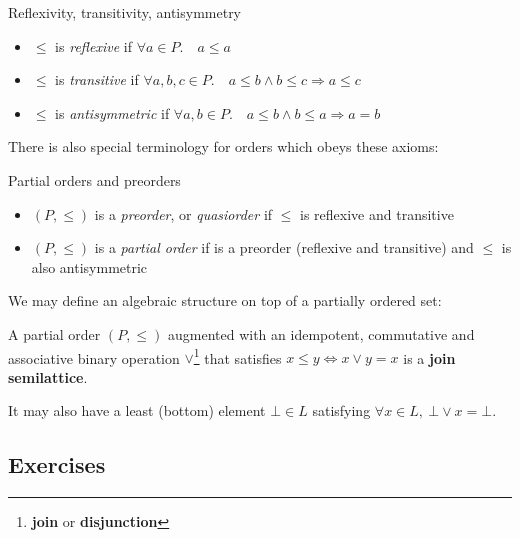\begin{definition}
Reflexivity, transitivity, antisymmetry
\begin{itemize}[noitemsep,topsep=0pt]
    \item $\leq$ is \textit{reflexive} if $\forall a \in P.\quad a \leq a$
    \item $\leq$ is \textit{transitive} if
      $\forall a,b,c \in P. \quad a \leq b \wedge b \leq c \Rightarrow a \leq c$
    \item $\leq$ is \textit{antisymmetric} if $\forall a,b \in P. \quad
      a \leq b \wedge b \leq a \Rightarrow a = b$
\end{itemize}
\end{definition}

There is also special terminology for orders which obeys these axioms:

\begin{definition} Partial orders and preorders
\begin{itemize}[noitemsep,topsep=0pt]
\item $(P, \leq)$ is a \emph{preorder}, or \emph{quasiorder} if $\leq$ is
reflexive and transitive
\item $(P, \leq)$ is a \emph{partial order} if is a preorder (reflexive and
transitive) and $\leq$ is also antisymmetric
\end{itemize}
\end{definition}

We may define an algebraic structure on top of a partially ordered set:

\begin{definition}
A partial order $(P, \leq)$ augmented with an idempotent, commutative and
associative binary operation $\lor$\footnote{\textbf{join} or
    \textbf{disjunction}} that satisfies $x \leq y \iff x \vee y = x$ is a
\textbf{join semilattice}.

It may also have a least (bottom) element $\bot \in L$ satisfying
$\forall x \in L,~\bot\lor x = \bot$.
\end{definition}

\subsection{Exercises}

